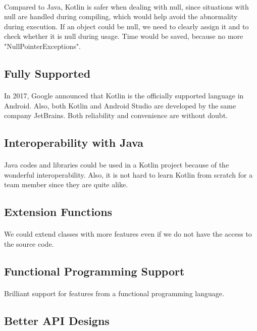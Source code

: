 \documentclass[paper=a4, fontsize=11pt]{scrartcl} %
\begin{document}
\paragraph{} Compared to Java, Kotlin is safer when dealing with null, since situations with null are handled during compiling, which would help avoid the abnormality during execution. If an object could be null, we need to clearly assign it and to check whether it is null during usage. Time would be saved, because no more "NullPointerExceptions".
\subsection{Fully Supported}
\paragraph{} In 2017, Google announced that Kotlin is the officially supported language in Android. Also, both Kotlin and Android Studio are developed by the same company JetBrains. Both reliability and convenience are without doubt.
\subsection{Interoperability with Java}
\paragraph{} Java codes and libraries could be used in a Kotlin project because of the wonderful interoperability. Also, it is not hard to learn Kotlin from scratch for a team member since they are quite alike.
\subsection{Extension Functions}
\paragraph{} We could extend classes with more features even if we do not have the access to the source code.
\subsection{Functional Programming Support}
\paragraph{} Brilliant support for features from a functional programming language.
\subsection{Better API Designs}
\end{document}
